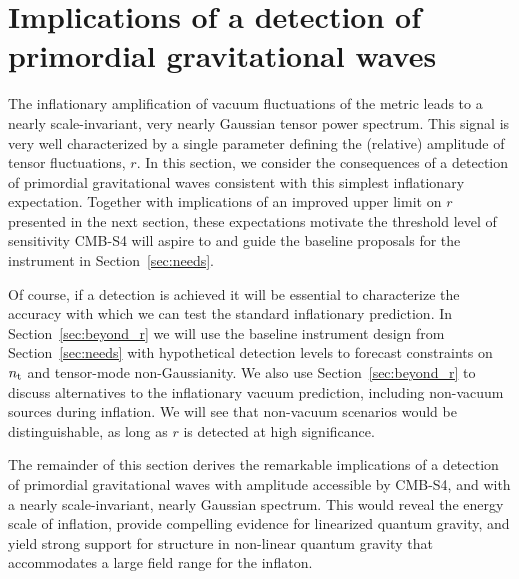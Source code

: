 \newpage
\section{Implications of a detection of primordial gravitational waves}
\label{sec:detection}

The inflationary amplification of vacuum fluctuations of the metric leads to a nearly scale-invariant, very nearly Gaussian tensor power spectrum. This signal is very well characterized by a single parameter defining the (relative) amplitude of tensor fluctuations, $r$. In this section, we consider the consequences of a detection of primordial gravitational waves consistent with this simplest inflationary expectation. Together with implications of an improved upper limit on $r$ presented in the next section, these expectations motivate the threshold level of sensitivity CMB-S4 will aspire to and guide the baseline proposals for the instrument in Section~\ref{sec:needs}. 

Of course, if a detection is achieved it will be essential to characterize the accuracy with which we can test the standard inflationary prediction. In Section~\ref{sec:beyond_r} we will use the baseline instrument design from Section~\ref{sec:needs} with hypothetical detection levels to forecast constraints on $n_{\rm t}$ and tensor-mode non-Gaussianity. We also use Section~\ref{sec:beyond_r} to discuss alternatives to the inflationary vacuum prediction, including non-vacuum sources during inflation. We will see that non-vacuum scenarios would be distinguishable, as long as $r$ is detected at high significance.

The remainder of this section derives the remarkable implications of a detection of primordial gravitational waves with amplitude accessible by CMB-S4, and with a nearly scale-invariant, nearly Gaussian spectrum.  This would reveal the energy scale of inflation, provide compelling evidence for linearized quantum gravity, and yield strong support for structure in non-linear quantum gravity that accommodates a large field range for the inflaton. 

